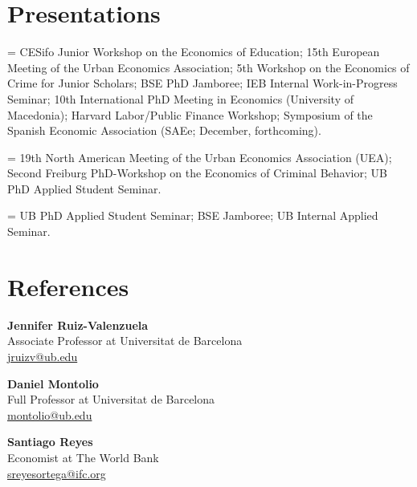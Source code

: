 \documentclass[11pt,a4paper]{article}
\begin{document}
\section*{Presentations}

\newlength{\presyear}%
{\raggedright{}
\hangindent=\presyear{}
CESifo Junior Workshop on the Economics of Education; 15th European Meeting of the Urban Economics Association; 5th Workshop on the Economics of Crime for Junior Scholars; BSE PhD Jamboree; IEB Internal Work-in-Progress Seminar; 10th International PhD Meeting in Economics (University of Macedonia); Harvard Labor/Public Finance Workshop; Symposium of the Spanish Economic Association (SAEe; December, forthcoming).\par
\vspace{0.5em}
\hangindent=\presyear{}
19th North American Meeting of the Urban Economics Association (UEA); Second Freiburg PhD-Workshop on the Economics of Criminal Behavior; UB PhD Applied Student Seminar.\par
\vspace{0.5em}
\hangindent=\presyear{}
UB PhD Applied Student Seminar; BSE Jamboree; UB Internal Applied Seminar.\par
}

\section*{References}

\textbf{Jennifer Ruiz-Valenzuela}\\
Associate Professor at Universitat de Barcelona\\
 \href{mailto:jruizv@ub.edu}{jruizv@ub.edu}

\vspace{0.5em}

\textbf{Daniel Montolio}\\
Full Professor at Universitat de Barcelona\\
 \href{mailto:montolio@ub.edu}{montolio@ub.edu}

\vspace{0.5em}

\textbf{Santiago Reyes}\\
Economist at The World Bank\\
 \href{mailto:sreyesortega@ifc.org}{sreyesortega@ifc.org}
\end{document}
